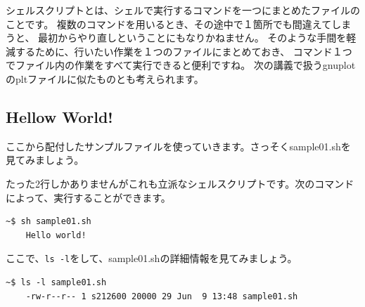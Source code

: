 \documentclass[a4j]{ltjreport}
\begin{document}
    シェルスクリプトとは、シェルで実行するコマンドを一つにまとめたファイルのことです。
    複数のコマンドを用いるとき、その途中で１箇所でも間違えてしまうと、
    最初からやり直しということにもなりかねません。
    そのような手間を軽減するために、行いたい作業を１つのファイルにまとめておき、
    コマンド１つでファイル内の作業をすべて実行できると便利ですね。
    次の講義で扱うgnuplotのpltファイルに似たものとも考えられます。

    \subsection{Hellow World!}

    ここから配付したサンプルファイルを使っていきます。さっそくsample01.shを見てみましょう。
    

    たった2行しかありませんがこれも立派なシェルスクリプトです。次のコマンドによって、実行することができます。
    \begin{lstlisting}[numbers=none]
    ~$ sh sample01.sh
    Hello world!
    \end{lstlisting}


    ここで、\texttt{ls -l}をして、sample01.shの詳細情報を見てみましょう。
    \begin{lstlisting}[numbers=none]
    ~$ ls -l sample01.sh
    -rw-r--r-- 1 s212600 20000 29 Jun  9 13:48 sample01.sh
    \end{lstlisting}
\end{document}
